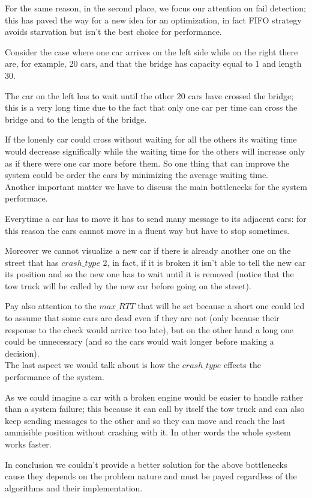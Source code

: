 For the same reason, in the second place, we focus our attention on 
fail detection; this has paved the way for a new idea for an optimization, 
in fact FIFO strategy avoids starvation but isn't the best choice for performance.

Consider the case where one car arrives on the left side while on the right there are, 
for example, 20 cars, and that the bridge has capacity equal to 1 and length 30. 

The car on the left has to wait until the other 20 cars have crossed the bridge; 
this is a very long time due to the fact that only one car per time can cross the bridge 
and to the length of the bridge.

If the lonenly car could cross without waiting for all the others its waiting time would 
decrease significally while the waiting time for the others will increase only 
as if there were one car more before them. 
So one thing that can improve the system could be order the cars by minimizing 
the average waiting time.\\

Another important matter we have to discuss the main bottlenecks
for the system performace. 

Everytime a car has to move it has to send many message to its adjacent cars: 
for this reason the cars cannot move in a fluent way but have to stop sometimes. 

Moreover we cannot visualize a new car if there is already another one on the 
street that has $crash\_type$ 2, in fact, if it is broken it isn't able to tell 
the new car its position and so the new one has to wait until it is removed 
(notice that the tow truck will be called by the new car before
going on the street).

Pay also attention to the $max\_RTT$ that will be set because a short one could led 
to assume that some cars are dead even if they are not 
(only because their response to the check would arrive too late), 
but on the other hand a long one could be unnecessary 
(and so the cars would wait longer before making a decision).\\

The last aspect we would talk about is how the $crash\_type$ effects the performance of 
the system. 

As we could imagine a car with a broken engine would be easier 
to handle rather than a system failure;
this because it can call by itself the tow truck and can also keep sending messages 
to the other and so they can move and reach the last ammisible position without 
crashing with it. In other words the whole system works faster.

In conclusion we couldn't provide a better solution for the above bottlenecks 
cause they depends on the problem nature and must be payed regardless 
of the algorithms and their implementation.